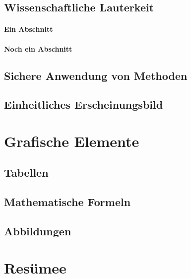 \documentclass[
  paper=a4, %
  11pt, %
  bibliography=totoc, %
  parskip=off, %
  oneside, %
  article, %
  accentcolor=tud8b, %
  colorback, %
  type=dr, %
  dr=ing %
]{tudthesis}
\begin{document}
\subsection{Wissenschaftliche Lauterkeit}
\blindtext

\paragraph{Ein Abschnitt}
\blindtext

\paragraph{Noch ein Abschnitt}
\blindtext


\subsection{Sichere Anwendung von Methoden}
\Blindtext

\subsection{Einheitliches Erscheinungsbild}
\blindtext

\clearpage



\section{Grafische Elemente}

\subsection{Tabellen}



\subsection{Mathematische Formeln}




\subsection{Abbildungen}





\clearpage


\section{Resümee}
\blindtext
\end{document}
